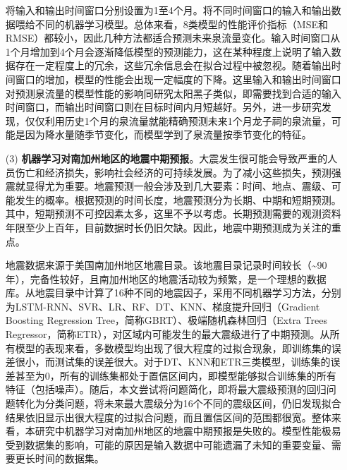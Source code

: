 \begin{enumerate}
  将输入和输出时间窗口分别设置为1至4个月。将不同时间窗口的输入和输出数据喂给不同的机器学习模型。总体来看，8类模型的性能评价指标（MSE和RMSE）都较小，因此几种方法都适合预测未来泉流量变化。输入时间窗口从1个月增加到4个月会逐渐降低模型的预测能力，这在某种程度上说明了输入数据存在一定程度上的冗余，这些冗余信息会在拟合过程中被忽视。随着输出时间窗口的增加，模型的性能会出现一定幅度的下降。这里输入和输出时间窗口对预测泉流量的模型性能的影响同研究太阳黑子类似，即需要找到合适的输入时间窗口，而输出时间窗口则在目标时间内月短越好。另外，进一步研究发现，仅仅利用历史1个月的泉流量就能精确预测未来1个月龙子祠的泉流量，可能是因为降水量随季节变化，而模型学到了泉流量按季节变化的特征。
  
  \item[(3)] \textbf{机器学习对南加州地区的地震中期预报}。大震发生很可能会导致严重的人员伤亡和经济损失，影响社会经济的可持续发展。为了减小这些损失，预测强震就显得尤为重要。地震预测一般会涉及到几大要素：时间、地点、震级、可能发生的概率。根据预测的时间长度，地震预测分为长期、中期和短期预测。其中，短期预测不可控因素太多，这里不予以考虑。长期预测需要的观测资料年限至少上百年，目前数据时长仍旧欠缺。因此，地震中期预测成为关注的重点。
  
  地震数据来源于美国南加州地区地震目录。该地震目录记录时间较长（\sim 90年），完备性较好，且南加州地区的地震活动较为频繁，是一个理想的数据库。从地震目录中计算了16种不同的地震因子，采用不同机器学习方法，分别为LSTM-RNN、SVR、LR、RF、DT、KNN、梯度提升回归（Gradient Boosting Regression Tree，简称GBRT）、极端随机森林回归（Extra Trees Regressor，简称ETR），对区域内可能发生的最大震级进行了中期预测。从所有模型的表现来看，多数模型均出现了很大程度的过拟合现象，即训练集的误差很小，而测试集的误差很大。对于DT、KNN和ETR三类模型，训练集的误差甚至为0，所有的训练集都处于置信区间内，即模型能够拟合训练集的所有特征（包括噪声）。随后，本文尝试将问题简化，即将最大震级预测的回归问题转化为分类问题，将未来最大震级分为16个不同的震级区间，仍旧发现拟合结果依旧显示出很大程度的过拟合问题，而且置信区间的范围都很宽。整体来看，本研究中机器学习对南加州地区的地震中期预报是失败的。模型性能极易受到数据集的影响，可能的原因是输入数据中可能遗漏了未知的重要变量、需要更长时间的数据集。

\end{enumerate}


